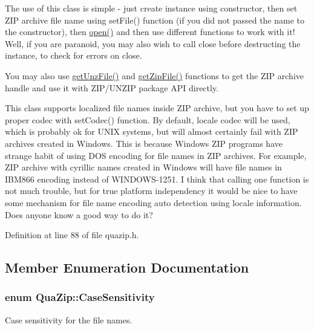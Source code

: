 The use of this class is simple -\/ just create instance using constructor, then set Z\-I\-P archive file name using set\-File() function (if you did not passed the name to the constructor), then \hyperlink{class_qua_zip_abfa4e6018b2964a3d10a4c54e5ab3962}{open()} and then use different functions to work with it! Well, if you are paranoid, you may also wish to call close before destructing the instance, to check for errors on close.

You may also use \hyperlink{class_qua_zip_a3b78a652f296ff4a678a791e8294e642}{get\-Unz\-File()} and \hyperlink{class_qua_zip_a425043a4d7cc31e2fe2bba73d954f15c}{get\-Zip\-File()} functions to get the Z\-I\-P archive handle and use it with Z\-I\-P/\-U\-N\-Z\-I\-P package A\-P\-I directly.

This class supports localized file names inside Z\-I\-P archive, but you have to set up proper codec with set\-Codec() function. By default, locale codec will be used, which is probably ok for U\-N\-I\-X systems, but will almost certainly fail with Z\-I\-P archives created in Windows. This is because Windows Z\-I\-P programs have strange habit of using D\-O\-S encoding for file names in Z\-I\-P archives. For example, Z\-I\-P archive with cyrillic names created in Windows will have file names in {\ttfamily I\-B\-M866} encoding instead of {\ttfamily W\-I\-N\-D\-O\-W\-S-\/1251}. I think that calling one function is not much trouble, but for true platform independency it would be nice to have some mechanism for file name encoding auto detection using locale information. Does anyone know a good way to do it? 

Definition at line 88 of file quazip.\-h.



\subsection{Member Enumeration Documentation}
\hypertarget{class_qua_zip_a6053a1d249ed210a85c9d5eb7cf9cdbe}{
\subsubsection[{Case\-Sensitivity}]{\setlength{\rightskip}{0pt plus 5cm}enum {\bf Qua\-Zip\-::\-Case\-Sensitivity}}}\label{class_qua_zip_a6053a1d249ed210a85c9d5eb7cf9cdbe}


Case sensitivity for the file names. 

